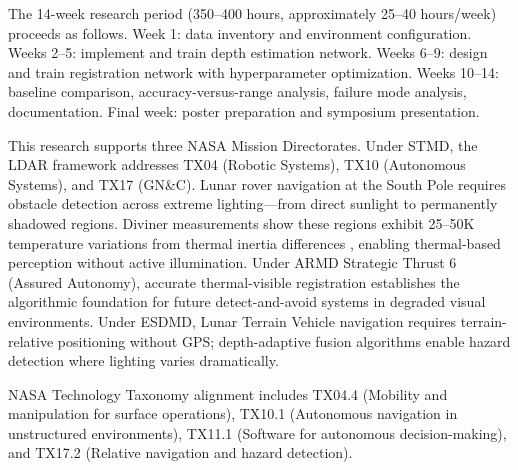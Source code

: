\documentclass[12pt]{article}
\newcommand{\sect}[1]{\noindent{\color{garnet}\textbf{\textsc{#1}}.}}
\begin{document}
\sect{Timeline}
The 14-week research period (350--400 hours, approximately 25--40 hours/week) proceeds as follows. Week 1: data inventory and environment configuration. Weeks 2--5: implement and train depth estimation network. Weeks 6--9: design and train registration network with hyperparameter optimization. Weeks 10--14: baseline comparison, accuracy-versus-range analysis, failure mode analysis, documentation. Final week: poster preparation and symposium presentation.

\sect{NASA Relevance}
This research supports three NASA Mission Directorates. Under STMD, the LDAR framework addresses TX04 (Robotic Systems), TX10 (Autonomous Systems), and TX17 (GN\&C). Lunar rover navigation at the South Pole requires obstacle detection across extreme lighting---from direct sunlight to permanently shadowed regions. Diviner measurements show these regions exhibit 25--50K temperature variations from thermal inertia differences \cite{paige2010}, enabling thermal-based perception without active illumination. Under ARMD Strategic Thrust 6 (Assured Autonomy), accurate thermal-visible registration establishes the algorithmic foundation for future detect-and-avoid systems in degraded visual environments. Under ESDMD, Lunar Terrain Vehicle navigation requires terrain-relative positioning without GPS; depth-adaptive fusion algorithms enable hazard detection where lighting varies dramatically.

NASA Technology Taxonomy alignment includes TX04.4 (Mobility and manipulation for surface operations), TX10.1 (Autonomous navigation in unstructured environments), TX11.1 (Software for autonomous decision-making), and TX17.2 (Relative navigation and hazard detection).
\end{document}
